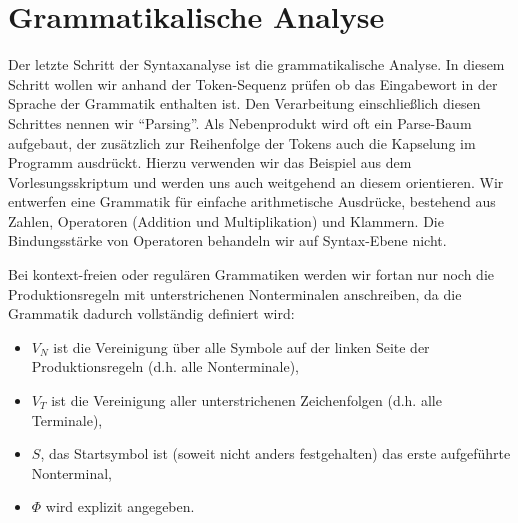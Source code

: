 \section{Grammatikalische Analyse}
Der letzte Schritt der Syntaxanalyse ist die grammatikalische Analyse. In diesem Schritt wollen wir anhand der Token-Sequenz prüfen ob das Eingabewort in der Sprache der Grammatik enthalten ist. Den Verarbeitung einschließlich diesen Schrittes nennen wir ``Parsing''. Als Nebenprodukt wird oft ein Parse-Baum aufgebaut, der zusätzlich zur Reihenfolge der Tokens auch die Kapselung im Programm ausdrückt.
Hierzu verwenden wir das Beispiel aus dem Vorlesungsskriptum und werden uns auch weitgehend an diesem orientieren.
Wir entwerfen eine Grammatik für einfache arithmetische Ausdrücke, bestehend aus Zahlen, Operatoren (Addition und Multiplikation) und Klammern. Die Bindungsstärke von Operatoren
behandeln wir auf Syntax-Ebene nicht.

Bei kontext-freien oder regulären Grammatiken werden wir fortan nur noch die Produktionsregeln mit unterstrichenen Nonterminalen anschreiben, da die Grammatik dadurch vollständig definiert wird:
\begin{itemize}
\item $V_N$ ist die Vereinigung über alle Symbole auf der linken Seite der Produktionsregeln (d.h. alle Nonterminale),
\item $V_T$ ist die Vereinigung aller unterstrichenen Zeichenfolgen (d.h. alle Terminale),
\item $S$, das Startsymbol ist (soweit nicht anders festgehalten) das erste aufgeführte Nonterminal,
\item $\Phi$ wird explizit angegeben.
\end{itemize}

